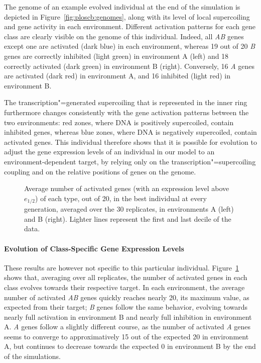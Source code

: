 The genome of an example evolved individual at the end of the simulation is depicted in Figure~\ref{fig:ploscb:genomes}, along with its level of local supercoiling and gene activity in each environment.
Different activation patterns for each gene class are clearly visible on the genome of this individual.
Indeed, all \emph{AB} genes except one are activated (dark blue) in each environment, whereas 19 out of 20 \emph{B} genes are correctly inhibited (light green) in environment A (left) and 18 correctly activated (dark green) in environment B (right).
Conversely, 16 \emph{A} genes are activated (dark red) in environment A, and 16 inhibited (light red) in environment B.

The transcription"=generated supercoiling that is represented in the inner ring furthermore changes consistently with the gene activation patterns between the two environments: red zones, where DNA is positively supercoiled, contain inhibited genes, whereas blue zones, where DNA is negatively supercoiled, contain activated genes.
This individual therefore shows that it is possible for evolution to adjust the gene expression levels of an individual in our model to an environment-dependent target, by relying only on the transcription"=supercoiling coupling and on the relative positions of genes on the genome.

\begin{figure}[H]
  \begin{elasticrow}[width=\textwidth]
  \end{elasticrow}
  \caption[Average number of activated genes during evolution in the advanced model]{Average number of activated genes (with an expression level above $e_{1/2}$) of each type, out of 20, in the best individual at every generation, averaged over the 30 replicates, in environments A (left) and B (right).
  Lighter lines represent the first and last decile of the data.}
  \label{fig:ploscb:gene_activity_by_env}
\end{figure}

\paragraph{Evolution of Class-Specific Gene Expression Levels}
These results are however not specific to this particular individual.
Figure~\ref{fig:ploscb:gene_activity_by_env} shows that, averaging over all replicates, the number of activated genes in each class evolves towards their respective target.
In each environment, the average number of activated \emph{AB} genes quickly reaches nearly 20, its maximum value, as expected from their target; \emph{B} genes follow the same behavior, evolving towards nearly full activation in environment B and nearly full inhibition in environment A.
\emph{A} genes follow a slightly different course, as the number of activated \emph{A} genes seems to converge to approximatively 15 out of the expected 20 in environment A, but continues to decrease towards the expected 0 in environment B by the end of the simulations.

